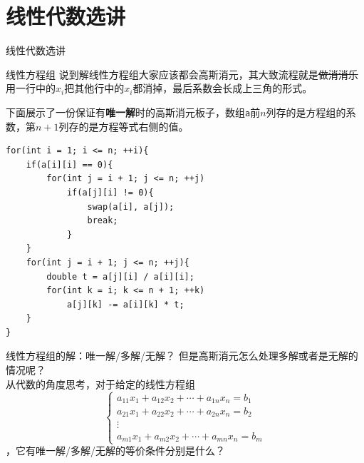 \documentclass{beamer}
\begin{document}
\section{线性代数选讲}
\begin{frame}
\begin{center}
	{\Huge 线性代数选讲}
\end{center}
\end{frame}

\begin{frame}[fragile]{线性方程组}
	说到解线性方程组大家应该都会高斯消元，其大致流程就是\sout{做消消乐}用一行中的$x_i$把其他行中的$x_i$都消掉，最后系数会长成上三角的形式。
	
	下面展示了一份保证有\textbf{唯一解}时的高斯消元板子，数组\texttt{a}前$n$列存的是方程组的系数，第$n + 1$列存的是方程等式右侧的值。
\begin{verbatim}
for(int i = 1; i <= n; ++i){
    if(a[i][i] == 0){
        for(int j = i + 1; j <= n; ++j)
            if(a[j][i] != 0){
                swap(a[i], a[j]);
                break;
            }
    }
    for(int j = i + 1; j <= n; ++j){
        double t = a[j][i] / a[i][i];
        for(int k = i; k <= n + 1; ++k)
            a[j][k] -= a[i][k] * t;
    }
}
\end{verbatim}
\end{frame}

\begin{frame}{线性方程组的解：唯一解/多解/无解？}
	但是高斯消元怎么处理多解或者是无解的情况呢？\\
	
	从代数的角度思考，对于给定的线性方程组$$\begin{cases}
		a_{11}x_1 + a_{12}x_2 + \cdots + a_{1n}x_n = b_1\\
		a_{21}x_1 + a_{22}x_2 + \cdots + a_{2n}x_n = b_2\\
		\vdots\\
		a_{m1}x_1 + a_{m2}x_2 + \cdots + a_{mn}x_n = b_m	\end{cases}$$
	，它有唯一解/多解/无解的等价条件分别是什么？\\
	
\end{frame}
\end{document}
